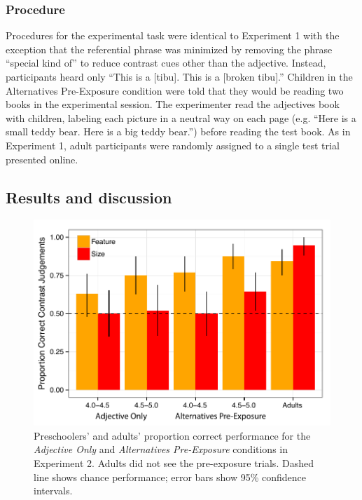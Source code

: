 \documentclass[man]{apa2}
\begin{document}
\subsubsection{Procedure}

Procedures for the experimental task were identical to Experiment 1 with the exception that the referential phrase was minimized by removing the phrase ``special kind of'' to reduce contrast cues other than the adjective.  Instead, participants heard only ``This is a [tibu]. This is a [broken tibu].''  Children in the Alternatives Pre-Exposure condition were told that they would be reading two books in the experimental session. The experimenter read the adjectives book with children, labeling each picture in a neutral way on each page (e.g. ``Here is a small teddy bear. Here is a big teddy bear.'') before reading the test book. As in Experiment 1, adult participants were randomly assigned to a single test trial presented online.  

\subsection{Results and discussion}

\begin{figure}[t] 
  \begin{center} 
    \includegraphics[width=5in]{figures/expt2_mod.pdf} 
    \caption{\label{fig:expt2_kidsAdults} Preschoolers' and adults' proportion correct performance for the \emph{Adjective Only} and \emph{Alternatives Pre-Exposure} conditions in Experiment 2. Adults did not see the pre-exposure trials. Dashed line shows chance performance; error bars show 95\% confidence intervals.}
  \end{center} 
\end{figure}
\end{document}

